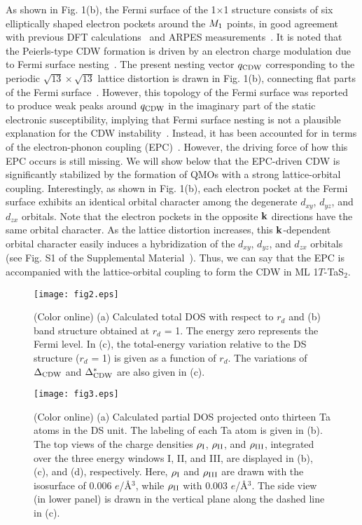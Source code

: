 \documentclass[aps,prl,twocolumn,showpacs,byrevtex]{revtex4}
\begin{document}
As shown in Fig. 1(b), the Fermi surface of the 1${\times}$1 structure consists of six elliptically shaped electron pockets around the $M_{\rm 1}$ points, in good agreement with previous DFT calculations~\cite{Myron,Shao} and ARPES measurements~\cite{Pillo,clerc2006prb}. It is noted that the Peierls-type CDW formation is driven by an electron charge modulation due to Fermi surface nesting~\cite{Peierls,Johannes,Zhua}. The present nesting vector $q_{\rm CDW}$ corresponding to the periodic ${\sqrt{13}}{\times}{\sqrt{13}}$ lattice distortion is drawn in Fig. 1(b), connecting flat parts of the Fermi surface~\cite{Myron,Pillo}. However, this topology of the Fermi surface was reported to produce weak peaks around $q_{\rm CDW}$ in the imaginary part of the static electronic susceptibility, implying that Fermi surface nesting is not a plausible explanation for the CDW instability~\cite{zhang2014prb}. Instead, it has been accounted for in terms of the electron-phonon coupling (EPC)~\cite{zhang2014prb,clerc2006prb}. However, the driving force of how this EPC occurs is still missing. We will show below that the EPC-driven CDW is significantly stabilized by the formation of QMOs with a strong lattice-orbital coupling. Interestingly, as shown in Fig. 1(b), each electron pocket at the Fermi surface exhibits an identical orbital character among the degenerate $d_{xy}$, $d_{yz}$, and $d_{zx}$ orbitals. Note that the electron pockets in the opposite ${\bf k}$ directions have the same orbital character. As the lattice distortion increases, this ${\bf k}$-dependent orbital character easily induces a hybridization of the $d_{xy}$, $d_{yz}$, and $d_{zx}$ orbitals (see Fig. S1 of the Supplemental Material~\cite{SM}). Thus, we can say that the EPC is accompanied with the lattice-orbital coupling to form the CDW in ML 1$T$-TaS$_2$.

\begin{figure}[h!t]
\texttt{[image: fig2.eps]}
\caption{(Color online) (a) Calculated total DOS with respect to $r_d$ and (b) band structure obtained at $r_d$ = 1. The energy zero represents the Fermi level. In (c), the total-energy variation relative to the DS structure ($r_d$ = 1) is given as a function of $r_d$. The variations of ${\Delta}_{\rm CDW}$ and ${\Delta}^{*}_{\rm CDW}$ are also given in (c).}
\label{figure:2}
\end{figure}

\begin{figure*}[h!t]
\texttt{[image: fig3.eps]}
\caption{(Color online) (a) Calculated partial DOS projected onto thirteen Ta atoms in the DS unit. The labeling of each Ta atom is given in (b). The top views of the charge densities ${\rho}_{\rm I}$, ${\rho}_{\rm II}$, and ${\rho}_{\rm III}$, integrated over the three energy windows I, II, and III, are displayed in (b), (c), and (d), respectively. Here, ${\rho}_{\rm I}$ and ${\rho}_{\rm III}$ are drawn with the isosurface of 0.006 $e$/{\AA}$^3$, while ${\rho}_{\rm II}$ with 0.003 $e$/{\AA}$^3$. The side view (in lower panel) is drawn in the vertical plane along the dashed line in (c).}
\label{figure:3}
\end{figure*}
\end{document}
